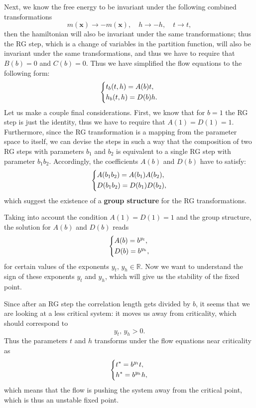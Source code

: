 Next, we know the free energy to be invariant under the following combined transformations
\[
    m(\mathbf{x}) \to -m(\mathbf{x}), \quad h \to -h, \quad t \to t,
\]
then the hamiltonian will also be invariant under the same transformations; thus the RG step, which is a change of variables in the partition function, will also be invariant under the same transformations, and thus we have to require that \(B(b)=0\) and \(C(b)=0\). Thus we have simplified the flow equations to the following form:
\[
    \begin{dcases}
        t_b (t,h) = A(b) t, \\
        h_b (t,h) = D(b) h.
    \end{dcases}
\]
Let us make a couple final considerations. First, we know that for \(b=1\) the RG step is just the identity, thus we have to require that \(A(1) = D(1) = 1\). Furthermore, since the RG transformation is a mapping from the parameter space to itself, we can devise the steps in such a way that the composition of two RG steps with parameters \(b_1\) and \(b_2\) is equivalent to a single RG step with parameter \(b_1 b_2\). Accordingly, the coefficients \(A(b)\) and \(D(b)\) have to satisfy:
\[
    \begin{dcases}
        A(b_1 b_2) = A(b_1)A(b_2), \\
        D(b_1 b_2) = D(b_1)D(b_2),
    \end{dcases}
\]
which suggest the existence of a \textbf{group structure} for the RG transformations.

Taking into account the condition \(A(1) = D(1) = 1\) and the group structure, the solution for \(A(b)\) and \(D(b)\) reads
\[
    \begin{dcases}
        A(b) = b^{y_t}, \\
        D(b) = b^{y_h},
    \end{dcases}
\]
for certain values of the exponents \(y_t,\,y_h \in \mathbb{R}\). Now we want to understand the sign of these exponents \(y_t\) and \(y_h\), which will give us the stability of the fixed point.

Since after an RG step the correlation length gets divided by \(b\), it seems that we are looking at a less critical system: it moves us away from criticality, which should correspond to
\[
    y_t,\,y_h >0.
\]
Thus the parameters \(t\) and \(h\) transforms under the flow equations near criticality as
\[
    \begin{dcases}
        t^* = b^{y_t} t, \\
        h^* = b^{y_h} h,
    \end{dcases}
\]
which means that the flow is pushing the system away from the critical point, which is thus an unstable fixed point.

